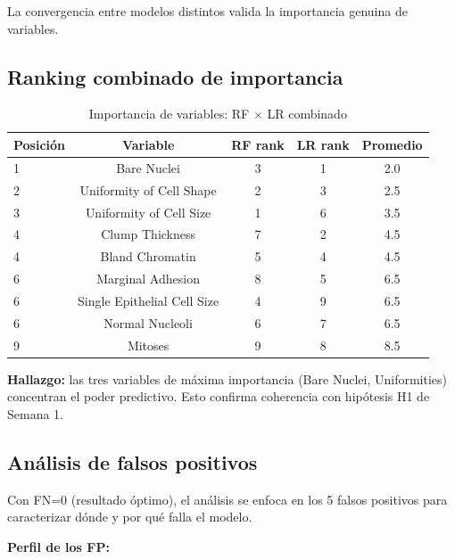 \documentclass[11pt,a4paper]{article}
\begin{document}
La convergencia entre modelos distintos valida la importancia genuina de variables.

\subsection{Ranking combinado de importancia}

\begin{table}[H]
\centering
\caption{Importancia de variables: RF $\times$ LR combinado}
\small
\renewcommand{\arraystretch}{1.15}
\begin{tabular}{lcccc}
\toprule
\textbf{Posición} & \textbf{Variable} & \textbf{RF rank} & \textbf{LR rank} & \textbf{Promedio} \\
\midrule
\rowcolor{bestrow}
1 & Bare Nuclei & 3 & 1 & 2.0 \\
\rowcolor{bestrow}
2 & Uniformity of Cell Shape & 2 & 3 & 2.5 \\
\rowcolor{bestrow}
3 & Uniformity of Cell Size & 1 & 6 & 3.5 \\
\midrule
4 & Clump Thickness & 7 & 2 & 4.5 \\
4 & Bland Chromatin & 5 & 4 & 4.5 \\
\midrule
6 & Marginal Adhesion & 8 & 5 & 6.5 \\
6 & Single Epithelial Cell Size & 4 & 9 & 6.5 \\
6 & Normal Nucleoli & 6 & 7 & 6.5 \\
\midrule
9 & Mitoses & 9 & 8 & 8.5 \\
\bottomrule
\end{tabular}
\normalsize
\end{table}

\textbf{Hallazgo:} las tres variables de máxima importancia (Bare Nuclei, Uniformities) concentran el poder predictivo. Esto confirma coherencia con hipótesis H1 de Semana 1.

\subsection{Análisis de falsos positivos}

Con FN=0 (resultado óptimo), el análisis se enfoca en los 5 falsos positivos para caracterizar dónde y por qué falla el modelo.

\textbf{Perfil de los FP:}
\end{document}

